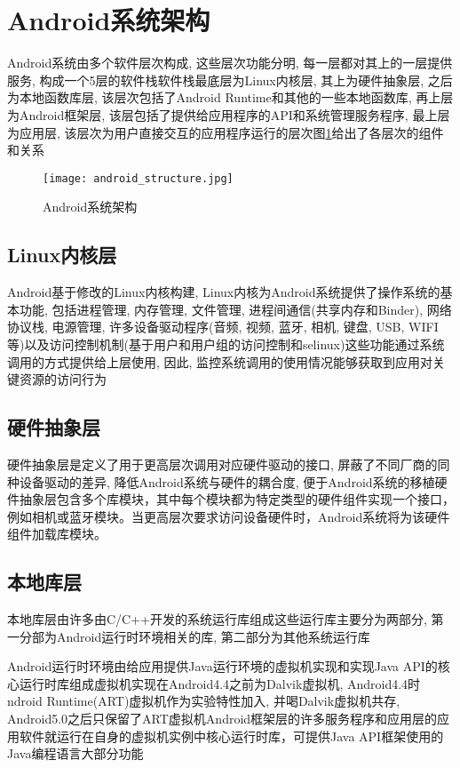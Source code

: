 \section{Android系统架构}
Android系统由多个软件层次构成, 这些层次功能分明, 每一层都对其上的一层提供服务, 构成一个5层的软件栈\juhao 软件栈最底层为Linux内核层, 其上为硬件抽象层, 之后为本地函数库层, 该层次包括了Android Runtime和其他的一些本地函数库, 再上层为Android框架层, 该层包括了提供给应用程序的API和系统管理服务程序, 最上层为应用层, 该层次为用户直接交互的应用程序运行的层次\juhao  图\ref{androidStructure}给出了各层次的组件和关系\juhao
\begin{figure}[ht]
\centering
\texttt{[image: android\_structure.jpg]}
\caption{Android系统架构}
\label{androidStructure}
\end{figure}

\subsection*{Linux内核层} 
Android基于修改的Linux内核构建, Linux内核为Android系统提供了操作系统的基本功能, 包括进程管理, 内存管理, 文件管理, 进程间通信(共享内存和Binder), 网络协议栈, 电源管理, 许多设备驱动程序(音频, 视频, 蓝牙, 相机, 键盘, USB, WIFI等)以及访问控制机制(基于用户和用户组的访问控制和selinux)\juhao 这些功能通过系统调用的方式提供给上层使用, 因此, 监控系统调用的使用情况能够获取到应用对关键资源的访问行为\juhao

\subsection*{硬件抽象层}
硬件抽象层是定义了用于更高层次调用对应硬件驱动的接口, 屏蔽了不同厂商的同种设备驱动的差异, 降低Android系统与硬件的耦合度, 便于Android系统的移植\juhao 硬件抽象层包含多个库模块，其中每个模块都为特定类型的硬件组件实现一个接口，例如相机或蓝牙模块。当更高层次要求访问设备硬件时，Android系统将为该硬件组件加载库模块。

\subsection*{本地库层}
本地库层由许多由C/C++开发的系统运行库组成\juhao 这些运行库主要分为两部分, 第一分部为Android运行时环境相关的库, 第二部分为其他系统运行库\juhao 

Android运行时环境由给应用提供Java运行环境的虚拟机实现和实现Java API的核心运行时库组成\juhao 虚拟机实现在Android4.4之前为Dalvik虚拟机, Android4.4时ndroid Runtime(ART)虚拟机作为实验特性加入, 并喝Dalvik虚拟机共存, Android5.0之后只保留了ART虚拟机\juhao Android框架层的许多服务程序和应用层的应用软件就运行在自身的虚拟机实例中\juhao 核心运行时库，可提供Java API框架使用的Java编程语言大部分功能\juhao

